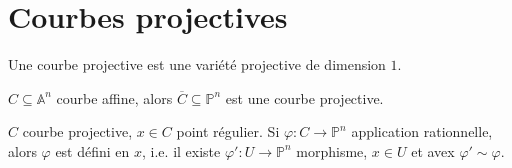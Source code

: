     \section{Courbes projectives}
        \begin{defi}
            Une courbe projective est une variété projective de dimension $1$.
        \end{defi}
        \begin{expl}
            $C \subseteq \mathbb{A}^n$ courbe affine, alors $\overline{C} \subseteq \mathbb{P}^n$ est une courbe projective.
        \end{expl}
        \begin{prop}
            $C$ courbe projective, $x \in C$ point régulier. Si $\varphi : C \to \mathbb{P}^n$ application rationnelle, alors $\varphi$ est défini en $x$, i.e. il existe $\varphi' : U \to \mathbb{P}^n$ morphisme, $x \in U$ et avex $\varphi' \sim \varphi$.
        \end{prop}
